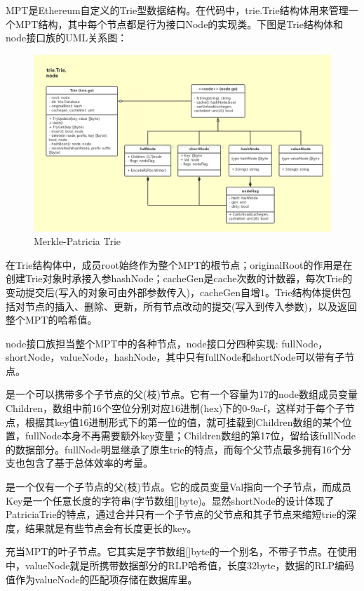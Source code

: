 \documentclass[UTF8]{ctexart}
\begin{document}

MPT是Ethereum自定义的Trie型数据结构。在代码中，trie.Trie结构体用来管理一个MPT结构，其中每个节点都是行为接口Node的实现类。下图是Trie结构体和node接口族的UML关系图：

\begin{figure}
	\centering
	\includegraphics[scale=0.4]{mpt.png}
	\caption{Merkle-Patricia Trie}
	\label{mpt}
\end{figure}

在Trie结构体中，成员root始终作为整个MPT的根节点；originalRoot的作用是在创建Trie对象时承接入参hashNode；cacheGen是cache次数的计数器，每次Trie的变动提交后(写入的对象可由外部参数传入)，cacheGen自增1。Trie结构体提供包括对节点的插入、删除、更新，所有节点改动的提交(写入到传入参数)，以及返回整个MPT的哈希值。

node接口族担当整个MPT中的各种节点，node接口分四种实现: fullNode，shortNode，valueNode，hashNode，其中只有fullNode和shortNode可以带有子节点。

 是一个可以携带多个子节点的父(枝)节点。它有一个容量为17的node数组成员变量Children，数组中前16个空位分别对应16进制(hex)下的0-9a-f，这样对于每个子节点，根据其key值16进制形式下的第一位的值，就可挂载到Children数组的某个位置，fullNode本身不再需要额外key变量；Children数组的第17位，留给该fullNode的数据部分。fullNode明显继承了原生trie的特点，而每个父节点最多拥有16个分支也包含了基于总体效率的考量。

 是一个仅有一个子节点的父(枝)节点。它的成员变量Val指向一个子节点，而成员Key是一个任意长度的字符串(字节数组[]byte)。显然shortNode的设计体现了PatriciaTrie的特点，通过合并只有一个子节点的父节点和其子节点来缩短trie的深度，结果就是有些节点会有长度更长的key。

 充当MPT的叶子节点。它其实是字节数组[]byte的一个别名，不带子节点。在使用中，valueNode就是所携带数据部分的RLP哈希值，长度32byte，数据的RLP编码值作为valueNode的匹配项存储在数据库里。
\end{document}
